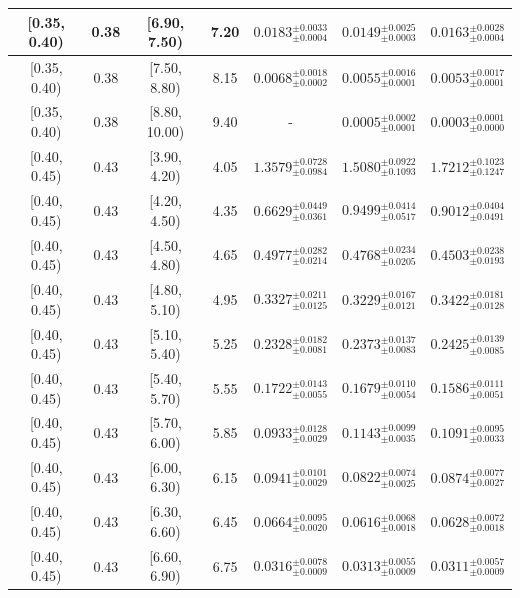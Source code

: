 \begin{longtable}{|c|c|c|c|c|c|c|}
[0.35, 0.40) & 0.38 & [6.90, 7.50) & 7.20 & $0.0183^{ \pm 0.0033 }_{ \pm 0.0004 }$ & $0.0149^{ \pm 0.0025 }_{ \pm 0.0003 }$ & $0.0163^{ \pm 0.0028 }_{ \pm 0.0004 }$ \\ 
\hline
[0.35, 0.40) & 0.38 & [7.50, 8.80) & 8.15 & $0.0068^{ \pm 0.0018 }_{ \pm 0.0002 }$ & $0.0055^{ \pm 0.0016 }_{ \pm 0.0001 }$ & $0.0053^{ \pm 0.0017 }_{ \pm 0.0001 }$ \\ 
\hline
[0.35, 0.40) & 0.38 & [8.80, 10.00) & 9.40 & - & $0.0005^{ \pm 0.0002 }_{ \pm 0.0001 }$ & $0.0003^{ \pm 0.0001 }_{ \pm 0.0000 }$ \\ 
\hline
[0.40, 0.45) & 0.43 & [3.90, 4.20) & 4.05 & $1.3579^{ \pm 0.0728 }_{ \pm 0.0984 }$ & $1.5080^{ \pm 0.0922 }_{ \pm 0.1093 }$ & $1.7212^{ \pm 0.1023 }_{ \pm 0.1247 }$ \\ 
\hline
[0.40, 0.45) & 0.43 & [4.20, 4.50) & 4.35 & $0.6629^{ \pm 0.0449 }_{ \pm 0.0361 }$ & $0.9499^{ \pm 0.0414 }_{ \pm 0.0517 }$ & $0.9012^{ \pm 0.0404 }_{ \pm 0.0491 }$ \\ 
\hline
[0.40, 0.45) & 0.43 & [4.50, 4.80) & 4.65 & $0.4977^{ \pm 0.0282 }_{ \pm 0.0214 }$ & $0.4768^{ \pm 0.0234 }_{ \pm 0.0205 }$ & $0.4503^{ \pm 0.0238 }_{ \pm 0.0193 }$ \\ 
\hline
[0.40, 0.45) & 0.43 & [4.80, 5.10) & 4.95 & $0.3327^{ \pm 0.0211 }_{ \pm 0.0125 }$ & $0.3229^{ \pm 0.0167 }_{ \pm 0.0121 }$ & $0.3422^{ \pm 0.0181 }_{ \pm 0.0128 }$ \\ 
\hline
[0.40, 0.45) & 0.43 & [5.10, 5.40) & 5.25 & $0.2328^{ \pm 0.0182 }_{ \pm 0.0081 }$ & $0.2373^{ \pm 0.0137 }_{ \pm 0.0083 }$ & $0.2425^{ \pm 0.0139 }_{ \pm 0.0085 }$ \\ 
\hline
[0.40, 0.45) & 0.43 & [5.40, 5.70) & 5.55 & $0.1722^{ \pm 0.0143 }_{ \pm 0.0055 }$ & $0.1679^{ \pm 0.0110 }_{ \pm 0.0054 }$ & $0.1586^{ \pm 0.0111 }_{ \pm 0.0051 }$ \\ 
\hline
[0.40, 0.45) & 0.43 & [5.70, 6.00) & 5.85 & $0.0933^{ \pm 0.0128 }_{ \pm 0.0029 }$ & $0.1143^{ \pm 0.0099 }_{ \pm 0.0035 }$ & $0.1091^{ \pm 0.0095 }_{ \pm 0.0033 }$ \\ 
\hline
[0.40, 0.45) & 0.43 & [6.00, 6.30) & 6.15 & $0.0941^{ \pm 0.0101 }_{ \pm 0.0029 }$ & $0.0822^{ \pm 0.0074 }_{ \pm 0.0025 }$ & $0.0874^{ \pm 0.0077 }_{ \pm 0.0027 }$ \\ 
\hline
[0.40, 0.45) & 0.43 & [6.30, 6.60) & 6.45 & $0.0664^{ \pm 0.0095 }_{ \pm 0.0020 }$ & $0.0616^{ \pm 0.0068 }_{ \pm 0.0018 }$ & $0.0628^{ \pm 0.0072 }_{ \pm 0.0018 }$ \\ 
\hline
[0.40, 0.45) & 0.43 & [6.60, 6.90) & 6.75 & $0.0316^{ \pm 0.0078 }_{ \pm 0.0009 }$ & $0.0313^{ \pm 0.0055 }_{ \pm 0.0009 }$ & $0.0311^{ \pm 0.0057 }_{ \pm 0.0009 }$ \\ 

\end{longtable}
